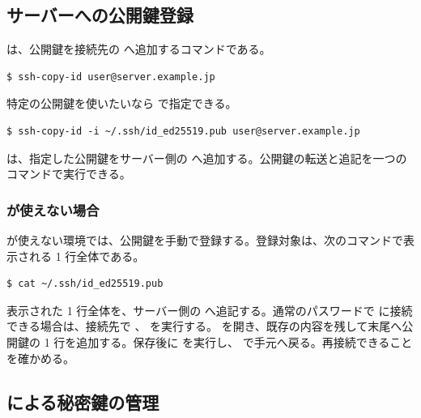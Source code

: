 \subsection{サーバーへの公開鍵登録}

 は、公開鍵を接続先の  へ追加するコマンドである。

\begin{lstlisting}[numbers=none, xleftmargin=2\zw]
$ ssh-copy-id user@server.example.jp
\end{lstlisting}

特定の公開鍵を使いたいなら  で指定できる。

\begin{lstlisting}[numbers=none, xleftmargin=2\zw]
$ ssh-copy-id -i ~/.ssh/id_ed25519.pub user@server.example.jp
\end{lstlisting}

 は、指定した公開鍵をサーバー側の  へ追加する。公開鍵の転送と追記を一つのコマンドで実行できる。

\subsubsection{ が使えない場合}

 が使えない環境では、公開鍵を手動で登録する。登録対象は、次のコマンドで表示される 1 行全体である。

\begin{lstlisting}[numbers=none, xleftmargin=2\zw]
$ cat ~/.ssh/id_ed25519.pub
\end{lstlisting}

表示された 1 行全体を、サーバー側の  へ追記する。通常のパスワードで  に接続できる場合は、接続先で 、 を実行する。 を開き、既存の内容を残して末尾へ公開鍵の 1 行を追加する。保存後に  を実行し、 で手元へ戻る。再接続できることを確かめる。

\subsection{ による秘密鍵の管理}

